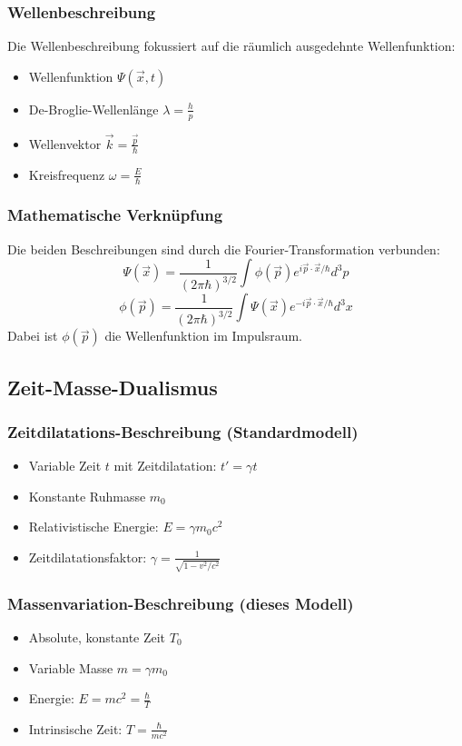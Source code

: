 \documentclass[a4paper,12pt]{article}
\begin{document}
	\subsubsection{Wellenbeschreibung}
	Die Wellenbeschreibung fokussiert auf die räumlich ausgedehnte Wellenfunktion:
	\begin{itemize}
		\item Wellenfunktion \( \Psi(\vec{x},t) \)
		\item De-Broglie-Wellenlänge \( \lambda = \frac{h}{p} \)
		\item Wellenvektor \( \vec{k} = \frac{\vec{p}}{\hbar} \)
		\item Kreisfrequenz \( \omega = \frac{E}{\hbar} \)
	\end{itemize}
	
	\subsubsection{Mathematische Verknüpfung}
	Die beiden Beschreibungen sind durch die Fourier-Transformation verbunden:
	\[
	\Psi(\vec{x}) = \frac{1}{(2\pi\hbar)^{3/2}} \int \phi(\vec{p}) e^{i\vec{p}\cdot\vec{x}/\hbar} d^3p
	\]
	\[
	\phi(\vec{p}) = \frac{1}{(2\pi\hbar)^{3/2}} \int \Psi(\vec{x}) e^{-i\vec{p}\cdot\vec{x}/\hbar} d^3x
	\]
	Dabei ist \( \phi(\vec{p}) \) die Wellenfunktion im Impulsraum.
	
	\subsection{Zeit-Masse-Dualismus}
	
	\subsubsection{Zeitdilatations-Beschreibung (Standardmodell)}
	\begin{itemize}
		\item Variable Zeit \( t \) mit Zeitdilatation: \( t' = \gamma t \)
		\item Konstante Ruhmasse \( m_0 \)
		\item Relativistische Energie: \( E = \gamma m_0c^2 \)
		\item Zeitdilatationsfaktor: \( \gamma = \frac{1}{\sqrt{1-v^2/c^2}} \)
	\end{itemize}
	
	\subsubsection{Massenvariation-Beschreibung (dieses Modell)}
	\begin{itemize}
		\item Absolute, konstante Zeit \( T_0 \)
		\item Variable Masse \( m = \gamma m_0 \)
		\item Energie: \( E = mc^2 = \frac{\hbar}{T} \)
		\item Intrinsische Zeit: \( T = \frac{\hbar}{mc^2} \)
	\end{itemize}
	
\end{document}
